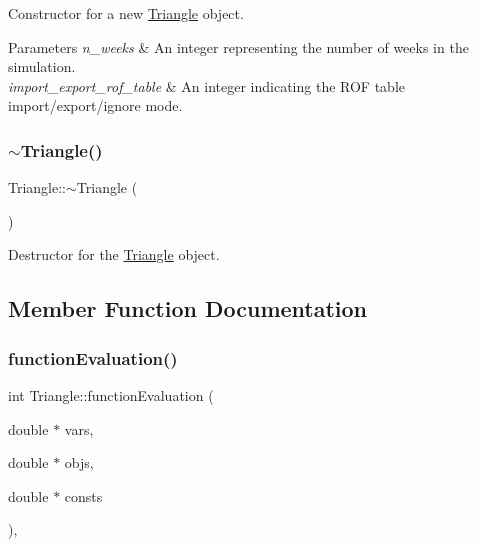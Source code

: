 Constructor for a new \mbox{\hyperlink{classTriangle}{Triangle}} object. 


\begin{DoxyParams}{Parameters}
{\em n\+\_\+weeks} & An integer representing the number of weeks in the simulation. \\
\hline
{\em import\+\_\+export\+\_\+rof\+\_\+table} & An integer indicating the R\+OF table import/export/ignore mode. \\
\hline
\end{DoxyParams}
\mbox{\label{classTriangle_a5199760a17454f4dc94c855a57e3a152}} 
\subsubsection{\texorpdfstring{$\sim$\+Triangle()}{~Triangle()}}
{\footnotesize\ttfamily Triangle\+::$\sim$\+Triangle (\begin{DoxyParamCaption}{ }\end{DoxyParamCaption})}



Destructor for the \mbox{\hyperlink{classTriangle}{Triangle}} object. 



\subsection{Member Function Documentation}
\mbox{\label{classTriangle_a9e95039d098fd61cce1a830b85ed7004}} 
\subsubsection{\texorpdfstring{function\+Evaluation()}{functionEvaluation()}}
{\footnotesize\ttfamily int Triangle\+::function\+Evaluation (\begin{DoxyParamCaption}\item[{double $\ast$}]{vars,  }\item[{double $\ast$}]{objs,  }\item[{double $\ast$}]{consts }\end{DoxyParamCaption})\hspace{0.3cm}{\ttfamily [override]}, {\ttfamily [virtual]}}



